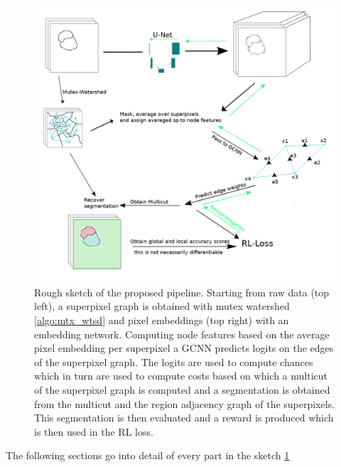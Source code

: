 \begin{figure}[ht!]
	\centering
	\includegraphics[width=1\textwidth]{figures/images/sketch_overall.png}
	\caption{Rough sketch of the proposed pipeline. Starting from raw data (top left), a superpixel graph is obtained with mutex watershed \ref{algo:mtx_wtsd} and pixel embeddings (top right) with an embedding network. Computing node features based on the average pixel embedding per superpixel a GCNN predicts logits on the edges of the superpixel graph. The logits are used to compute chances which in turn are used to compute costs based on which a multicut of the superpixel graph is computed and a segmentation is obtained from the multicut and the region adjacency graph of the superpixels. This segmentation is then evaluated and a reward is produced which is then used in the RL loss.}
	\label{overview}
\end{figure}


The following sections go into detail of every part in the sketch \ref{overview}